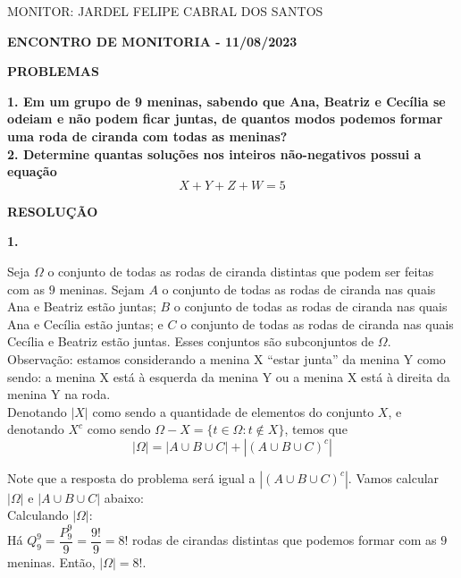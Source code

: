 \documentclass[12pt, a4paper]{article}
\begin{document}
\begin{flushleft}

MONITOR: JARDEL FELIPE CABRAL DOS SANTOS\\[1cm] 
\end{flushleft}

\begin{center} \textbf{ENCONTRO DE MONITORIA - 11/08/2023\\[1cm]}
\end{center}

\begin{center}
\textbf{PROBLEMAS}
\end{center}

\textbf{1. Em um grupo de 9 meninas, sabendo que Ana, Beatriz e Cecília se odeiam e não podem ficar juntas, de quantos modos podemos formar uma roda de ciranda com todas as meninas?} \\

\textbf{2. Determine quantas soluções nos inteiros não-negativos possui a equação \[X+Y+Z+W=5\]} 

\begin{center}
\textbf{RESOLUÇÃO}
\end{center}

\textbf{1.}

Seja \(\Omega\) o conjunto de todas as rodas de ciranda distintas que podem ser feitas com as \(9\) meninas. Sejam \(A\) o conjunto de todas as rodas de ciranda nas quais Ana e Beatriz estão juntas; \(B\) o conjunto de todas as rodas de ciranda nas quais Ana e Cecília estão juntas; e \(C\) o conjunto de todas as rodas de ciranda nas quais Cecília e Beatriz estão juntas. Esses conjuntos são subconjuntos de \(\Omega\). \\

Observação: estamos considerando a menina X ``estar junta'' da menina Y como sendo: a menina X está à esquerda da menina Y ou a menina X está à direita da menina Y na roda. \\

Denotando \(|X|\) como sendo a quantidade de elementos do conjunto \(X\), e denotando \(X^c\) como sendo \(\Omega - X = \{t \in \Omega: t \notin X\}\), temos que \[|\Omega| = |A\cup B \cup C| + |(A \cup B  \cup C)^c|\]

Note que a resposta do problema será igual a \(|(A \cup B  \cup C)^c|\). Vamos calcular \(|\Omega|\) e \(|A \cup B  \cup C|\) abaixo: \\
 
Calculando \(|\Omega|\): \\ 
Há \(Q^{9}_{9}= \dfrac{P^9_9}{9} = \dfrac{9!}{9} = 8!\) rodas de cirandas distintas que podemos formar com as \(9\) meninas. Então, \(|\Omega| = 8!\). \\
\end{document}
